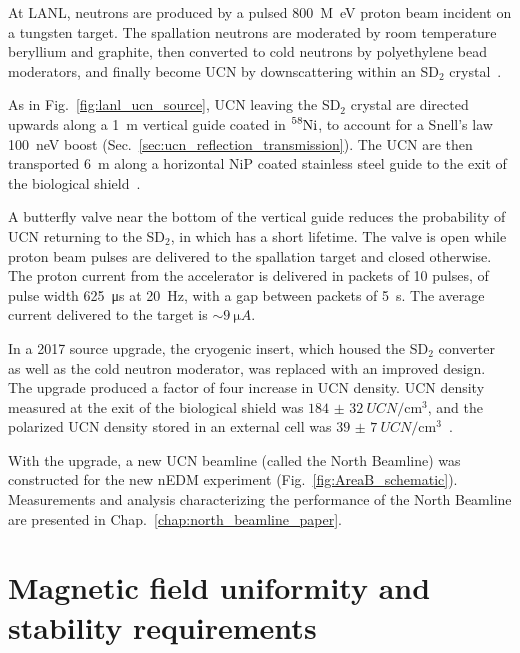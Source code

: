 At LANL, neutrons are produced by a pulsed \qty{800}{M\eV} proton beam incident on a tungsten target. The spallation neutrons are moderated by room temperature beryllium and graphite, then converted to cold neutrons by polyethylene bead moderators, and finally become UCN by downscattering within an SD$_2$ crystal~\cite{saunders_performance_2013}.

As in Fig.~\ref{fig:lanl_ucn_source}, UCN leaving the SD$_2$ crystal are directed upwards along a \qty{1}{\meter} vertical guide coated in $\ce{^{58}Ni}$, to account for a Snell's law \qty{100}{\nano\eV} boost (Sec.~\ref{sec:ucn_reflection_transmission}). The UCN are then transported \qty{6}{\meter} along a horizontal NiP coated stainless steel guide to the exit of the biological shield~\cite{ito_performance_2018}.

A butterfly valve near the bottom of the vertical guide reduces the probability of UCN returning to the SD$_2$, in which \ucn has a short lifetime. The valve is open while proton beam pulses are delivered to the spallation target and closed otherwise. The proton current from the accelerator is delivered in packets of 10 pulses, of pulse width \qty{625}{\micro\s} at \qty{20}{\hertz}, with a gap between packets of \qty{5}{\s}. The average current delivered to the target is $\sim\qty{9}{\micro A}$.

In a 2017 source upgrade, the cryogenic insert, which housed the SD$_2$ converter as well as the cold neutron moderator, was replaced with an improved design. The upgrade produced a factor of four increase in UCN density. UCN density measured at the exit of the biological shield was $\qty{184(32)}{UCN\per \cm^3}$, and the polarized UCN density stored in an external cell was $\qty{39(7)}{UCN\per \cm^3}$~\cite{ito_performance_2018}.

With the upgrade, a new UCN beamline (called the North Beamline) was constructed for the new nEDM experiment (Fig.~\ref{fig:AreaB_schematic}). Measurements and analysis characterizing the performance of the North Beamline are presented in Chap.~\ref{chap:north_beamline_paper}.



\section
{
    Magnetic field uniformity and stability requirements\label{sec:magnetic_field_req}
}


